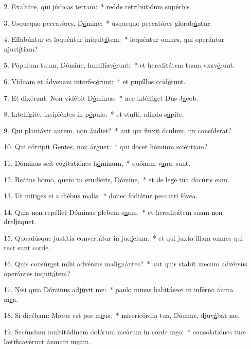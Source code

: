 2. Exaltáre, qui júdicas t\uline{e}rram:~* redde retributiónm sup\uline{é}rbis.\par 
3. Usquequo peccatóres, D\uline{ó}mine:~* úsquequo peccatóres glorab\uline{ú}ntur:\par 
4. Effabúntur et loquéntur iniquit\uline{á}tem:~* loquéntur omnes, qui operántur njust\uline{í}tiam?\par 
5. Pópulum tuum, Dómine, humiliav\uline{é}runt:~* et hereditátem tuam vxav\uline{é}runt.\par 
6. Víduam et ádvenam interfec\uline{é}runt:~* et pupíllos ccid\uline{é}runt.\par 
7. Et dixérunt: Non vidébit D\uline{ó}minus:~* nec intélliget Dus J\uline{a}cob.\par 
8. Intellígite, insipiéntes in p\uline{ó}pulo:~* et stulti, alindo s\uline{á}pite.\par 
9. Qui plantávit aurem, non \uline{áu}diet?~* aut qui finxit óculum, nn cons\uline{í}derat?\par 
10. Qui córripit Gentes, non \uline{á}rguet:~* qui docet hóminm sci\uline{é}ntiam?\par 
11. Dóminus scit cogitatiónes h\uline{ó}minum,~* quónam v\uline{a}næ sunt.\par 
12. Beátus homo, quem tu erudíeris, D\uline{ó}mine,~* et de lege tua docúris \uline{e}um.\par 
13. Ut mítiges ei a diébus m\uline{a}lis:~* donec fodiátur peccatri f\uline{ó}vea.\par 
14. Quia non repéllet Dóminus plebem s\uline{u}am:~* et hereditátem suam non drel\uline{í}nquet.\par 
15. Quoadúsque justítia convertátur in jud\uline{í}cium:~* et qui juxta illam omnes qui rect sunt c\uline{o}rde.\par 
16. Quis consúrget mihi advérsus malign\uline{á}ntes?~* aut quis stabit mecum advérsus operántes inquit\uline{á}tem?\par 
17. Nisi quia Dóminus adj\uline{ú}vit me:~* paulo minus habitásset in inférno ánma m\uline{e}a.\par 
18. Si dicébam: Motus est pes m\uline{e}us:~* misericórdia tua, Dómine, djuv\uline{á}bat me.\par 
19. Secúndum multitúdinem dolórum meórum in corde m\uline{e}o:~* consolatiónes tuæ lætificavérunt ánmam m\uline{e}am.\par 
